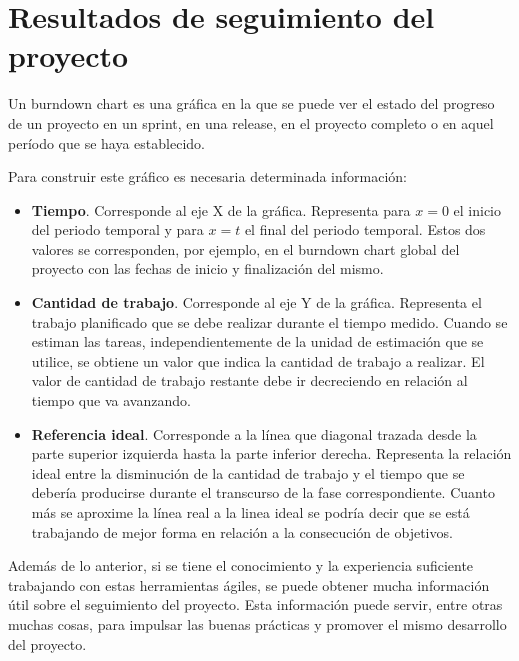 \newpage
\section{Resultados de seguimiento del proyecto}
Un burndown chart es una gráfica en la que se puede ver el estado del progreso de un proyecto en un sprint, en una release, en el proyecto completo o en aquel período que se haya establecido.

Para construir este gráfico es necesaria determinada información:
\begin{itemize}
    \item \textbf{Tiempo}. Corresponde al eje X de la gráfica. Representa para $x=0$ el inicio del periodo temporal y para $x=t$ el final del periodo temporal. Estos dos valores se corresponden, por ejemplo, en el burndown chart global del proyecto con las fechas de inicio y finalización del mismo.
    \item \textbf{Cantidad de trabajo}. Corresponde al eje Y de la gráfica. Representa el trabajo planificado que se debe realizar durante el tiempo medido. Cuando se estiman las tareas, independientemente de la unidad de estimación que se utilice, se obtiene un valor que indica la cantidad de trabajo a realizar. El valor de cantidad de trabajo restante debe ir decreciendo en relación al tiempo que va avanzando.
    \item \textbf{Referencia ideal}. Corresponde a la línea que diagonal trazada desde la parte superior izquierda hasta la parte inferior derecha. Representa la relación ideal entre la disminución de la cantidad de trabajo y el tiempo que se debería producirse durante el transcurso de la fase correspondiente. Cuanto más se aproxime la línea real a la linea ideal se podría decir que se está trabajando de mejor forma en relación a la consecución de objetivos.
\end{itemize}

Además de lo anterior, si se tiene el conocimiento y la experiencia suficiente trabajando con estas herramientas ágiles, se puede obtener mucha información útil sobre el seguimiento del proyecto. Esta información puede servir, entre otras muchas cosas, para impulsar las buenas prácticas y promover el mismo desarrollo del proyecto. 


